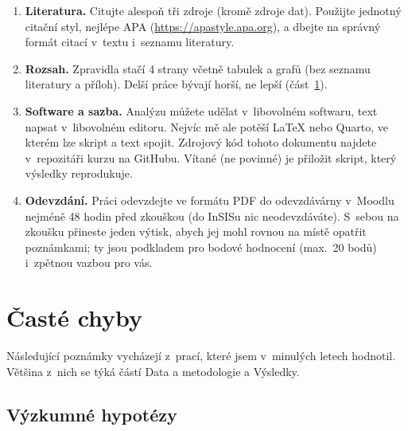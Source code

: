 \documentclass[11pt,a4paper]{article}
\begin{document}
\begin{enumerate}[itemsep=3pt, topsep=3pt]
  \item \textbf{Literatura.} Citujte alespoň tři zdroje (kromě zdroje dat). Použijte jednotný citační styl, nejlépe APA (\url{https://apastyle.apa.org}), a dbejte na správný formát citací v~textu i~seznamu literatury.
  \item \textbf{Rozsah.} Zpravidla stačí 4 strany včetně tabulek a grafů (bez seznamu literatury a příloh). Delší práce bývají horší, ne lepší (část~\ref{sec:chyby}).
  \item \textbf{Software a sazba.} Analýzu můžete udělat v~libovolném softwaru, text napsat v~libovolném editoru. Nejvíc mě ale potěší \LaTeX{} nebo Quarto, ve kterém lze skript a text spojit. Zdrojový kód tohoto dokumentu najdete v~repozitáři kurzu na GitHubu. Vítané (ne povinné) je přiložit skript, který výsledky reprodukuje.
  \item \textbf{Odevzdání.} Práci odevzdejte ve formátu PDF do odevzdávárny v~Moodlu nejméně 48 hodin před zkouškou (do InSISu nic neodevzdáváte). S~sebou na zkoušku přineste jeden výtisk, abych jej mohl rovnou na místě opatřit poznámkami; ty jsou podkladem pro bodové hodnocení (max.\ 20 bodů) i~zpětnou vazbou pro vás.
\end{enumerate}

\section{Časté chyby}
\label{sec:chyby}

Následující poznámky vycházejí z~prací, které jsem v~minulých letech hodnotil. Většina z~nich se týká částí Data a metodologie a Výsledky.

\subsection*{Výzkumné hypotézy}
\end{document}
